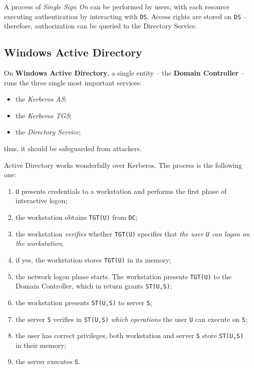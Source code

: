 \documentclass[10pt]{extbook}
\begin{document}
A process of \emph{Single Sign On} can be performed by users, with each
resource executing authentication by interacting with \texttt{DS}. Access
rights are stored on \texttt{DS} -- therefore, authorization can be queried to
the Directory Service.

\subsection{Windows Active Directory}

On \textbf{Windows Active Directory}, a single entity -- the \textbf{Domain
Controller} -- runs the three single most important services:
\begin{itemize}
    \item the \emph{Kerberos AS};
    \item the \emph{Kerberos TGS};
    \item the \emph{Directory Service};
\end{itemize}
thus, it should be safeguarded from attackers.

Active Directory works wonderfully over Kerberos. The process is the following
one:
\begin{enumerate}
    \item \texttt{U} presents credentials to a workstation and performs the
        first phase of interactive logon;
    \item the workstation obtains \texttt{TGT(U)} from \texttt{DC};
    \item the workstation \emph{verifies} whether \texttt{TGT(U)} specifies
        that \emph{the user \texttt{U} can logon on the workstation};
    \item if yes, the workstation stores \texttt{TGT(U)} in its memory;
    \item the network logon phase starts. The workstation presents
        \texttt{TGT(U)} to the Domain Controller, which in return grants
        \texttt{ST(U,S)};
    \item the workstation presents \texttt{ST(U,S)} to server \texttt{S};
    \item the server \texttt{S} verifies in \texttt{ST(U,S)} \emph{which
        operations} the user \texttt{U} can execute on \texttt{S};
    \item the user has correct privileges, both workstation and server
        \texttt{S} store \texttt{ST(U,S)} in their memory;
    \item the server executes \texttt{S}.
\end{enumerate}
\end{document}
